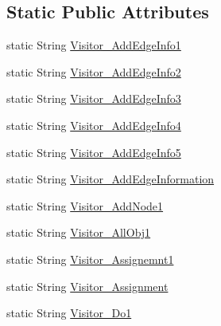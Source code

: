 \subsection*{Static Public Attributes}
\begin{DoxyCompactItemize}
\item 
static String \hyperlink{classit_1_1isislab_1_1masonassisteddocumentation_1_1visitor_1_1_messages_a76f4089ecafc0d283150bc469e9ba9d2}{Visitor\-\_\-\-Add\-Edge\-Info1}
\item 
static String \hyperlink{classit_1_1isislab_1_1masonassisteddocumentation_1_1visitor_1_1_messages_a14a1bfb5f9cad9d4e00230ed97aace71}{Visitor\-\_\-\-Add\-Edge\-Info2}
\item 
static String \hyperlink{classit_1_1isislab_1_1masonassisteddocumentation_1_1visitor_1_1_messages_a62fd79b6e4af88ed2f4596b7836e8437}{Visitor\-\_\-\-Add\-Edge\-Info3}
\item 
static String \hyperlink{classit_1_1isislab_1_1masonassisteddocumentation_1_1visitor_1_1_messages_adc0e5a664bddc6dfa2481c6820b6bcd4}{Visitor\-\_\-\-Add\-Edge\-Info4}
\item 
static String \hyperlink{classit_1_1isislab_1_1masonassisteddocumentation_1_1visitor_1_1_messages_a31c7044fdb1c3be45a2a7994c15f46df}{Visitor\-\_\-\-Add\-Edge\-Info5}
\item 
static String \hyperlink{classit_1_1isislab_1_1masonassisteddocumentation_1_1visitor_1_1_messages_a27fe267028024a7167f261d0b33fb2f9}{Visitor\-\_\-\-Add\-Edge\-Information}
\item 
static String \hyperlink{classit_1_1isislab_1_1masonassisteddocumentation_1_1visitor_1_1_messages_a92bac00318abe7b11c65bd1495747795}{Visitor\-\_\-\-Add\-Node1}
\item 
static String \hyperlink{classit_1_1isislab_1_1masonassisteddocumentation_1_1visitor_1_1_messages_ad36be56f46ad73772bdb6f3e8408eb91}{Visitor\-\_\-\-All\-Obj1}
\item 
static String \hyperlink{classit_1_1isislab_1_1masonassisteddocumentation_1_1visitor_1_1_messages_ae6b7b30a76b4b6564d2684d906822684}{Visitor\-\_\-\-Assignemnt1}
\item 
static String \hyperlink{classit_1_1isislab_1_1masonassisteddocumentation_1_1visitor_1_1_messages_a0eebf4070dca3dfe140226d565d3a327}{Visitor\-\_\-\-Assignment}
\item 
static String \hyperlink{classit_1_1isislab_1_1masonassisteddocumentation_1_1visitor_1_1_messages_a097857295e981520b9c67dffed26882d}{Visitor\-\_\-\-Do1}
\item 

\end{DoxyCompactItemize}
